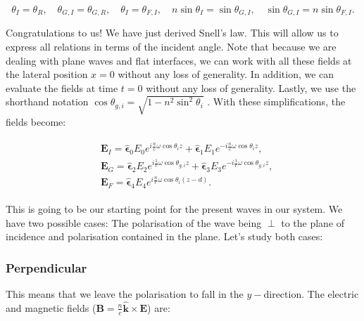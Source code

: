 \begin{equation}
	\theta_{I}=\theta_{R}, \quad \theta_{G, I}=\theta_{G, R}, \quad \theta_{I}=\theta_{F, I},\quad  n \sin \theta_{I}=\sin \theta_{G, I}, \quad \sin \theta_{G, I}=n \sin \theta_{F, I}.
\end{equation}

Congratulations to us! We have just derived Snell's law. This will allow us to express all relations in terms of the incident angle. Note that because we are dealing with plane waves and flat interfaces, we can work with all these fields at the lateral position
$x = 0$ without any loss of generality. In addition, we can evaluate the fields at time $t = 0$ without any loss of generality. Lastly, we use the shorthand notation $\cos \theta_{g,i} = \sqrt{1 - n^{2} \sin^{2} \theta_{i}}$ . With these simplifications, the fields become:

\begin{equation}
	\begin{split}
		\begin{aligned}
			&\mathbf{E}_{I}=\hat{\mathbf{\epsilon}}_{0} E_{0} e^{i \frac{n}{c} \omega \cos \theta_{i} z}+\hat{\boldsymbol{\epsilon}}_{1} E_{1} e^{-i \frac{n}{c} \omega \cos \theta_{i} z}, \\
			&\mathbf{E}_{G}=\hat{\boldsymbol{\epsilon}}_{2} E_{2} e^{i \frac{1}{c} \omega \cos \theta_{g, i} z}+\hat{\boldsymbol{\epsilon}}_{3} E_{3} e^{-i \frac{1}{c} \omega \cos \theta_{g, i} z}, \\
			&\mathbf{E}_{F}=\hat{\mathbf{\epsilon}}_{4} E_{4} e^{i \frac{n}{c} \omega \cos \theta_{i}(z-d)}.
		\end{aligned}
	\end{split}
\end{equation}

This is going to be our starting point for the present waves in our system. We have two possible cases: The polarisation of the wave being $\perp$ to the plane of incidence and polarisation contained in the plane. Let's study both cases:

\subsubsection*{Perpendicular}

This means that we leave the polarisation to fall in the $y-$direction. The electric and magnetic fields ($\mathbf{B} = \tfrac{n}{c} \hat{\mathbf{k}} \times \mathbf{E}$) are:

